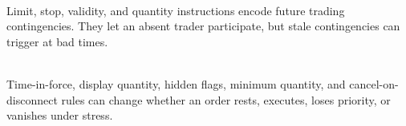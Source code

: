 \documentclass[a4paper,oneside,openany]{book}
\begin{document}
\begin{principle} \\
Limit, stop, validity, and quantity instructions encode future trading contingencies. They let an absent trader participate, but stale contingencies can trigger at bad times.
\end{principle}

\begin{caveat} \\
Time-in-force, display quantity, hidden flags, minimum quantity, and cancel-on-disconnect rules can change whether an order rests, executes, loses priority, or vanishes under stress.
\end{caveat}
\end{document}
